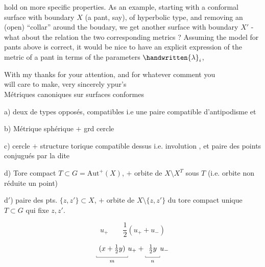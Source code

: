 
hold on more specific properties. As an example, starting with a  conformal surface with boundary $X$ (a pant, say), of hyperbolic type, and removing an \deleted{-}(open) ``collar'' around the boudary, we get another surface with boundary $X'$ - what about the relation  the two corresponding metrics ? Assuming the model for pants above is correct, it would be nice to have an explicit expression of the metric of a pant in terms of the parameters $\handwritten{\lambda}_i$,

With my thanks for your attention, and for whatever comment you\\
will care to make, very sincerely ypur's\\

Métriques canoniques sur surfaces conformes

a) deux  de types opposés, compatibles i.e une paire compatible d'antipodisme et 

b) Métrique sphérique $+$ grd cercle

c) cercle $+$ structure torique compatible dessus i.e. involution , et paire des points conjugués par la dite

d) Tore compact $T\subset G=\mathrm{Aut}^{+}(X)$, $+$ orbite de $X\setminus X^T$ sous $T$ (i.e. orbite non réduite  un point)

d$'$) paire des pts. $\{z,z'\}\subset X$, $+$ orbite de $X\setminus\{z,z'\}$ du tore compact unique $T\subset G$ qui fixe $z,z'$.

\[
u_+ \qquad \frac{1}{2}(u_++u_-)
\]

\[
\underset{m}{\underset{\rule{.35pt}{2pt}\rule{4.4em}{.35pt}\rule{.35pt}{2pt}}{(x+\tfrac{1}{2}y)}}u_+
+\underset{n}{\underset{\rule{.35pt}{2pt}\rule{2em}{.35pt}\rule{.35pt}{2pt}}{\tfrac{1}{2}y}}u_-
\]


